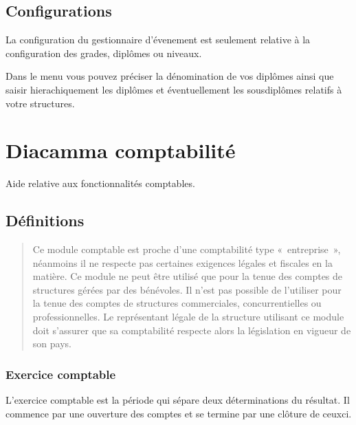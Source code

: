 \documentclass[a4paper,10pt,oneside,french]{sphinxmanual}
\begin{document}
\section{Configurations}
\label{\detokenize{event/config:configurations}}\label{\detokenize{event/config::doc}}
\sphinxAtStartPar
La configuration du gestionnaire d’évenement est seulement relative à la configuration des grades, diplômes ou niveaux.

\sphinxAtStartPar
Dans le menu  vous pouvez préciser la dénomination de vos diplômes
ainsi que saisir hierachiquement les diplômes et éventuellement les sous\sphinxhyphen{}diplômes relatifs à votre structures.


\chapter{Diacamma comptabilité}
\label{\detokenize{accounting/index:diacamma-comptabilite}}\label{\detokenize{accounting/index::doc}}
\sphinxAtStartPar
Aide relative aux fonctionnalités comptables.


\section{Définitions}
\label{\detokenize{accounting/definition:definitions}}\label{\detokenize{accounting/definition::doc}}\begin{quote}

\sphinxAtStartPar
{} Ce module comptable est proche d’une comptabilité type « entreprise », néanmoins il ne respecte pas certaines exigences légales et fiscales en la matière.
Ce module ne peut être utilisé que pour la tenue des comptes de structures gérées par des bénévoles. Il n’est pas possible de l’utiliser pour la tenue des comptes de structures commerciales, concurrentielles ou professionnelles.
Le représentant légale de la structure utilisant ce module doit s’assurer que sa comptabilité respecte alors la législation en vigueur de son pays.
\end{quote}


\subsection{Exercice comptable}
\label{\detokenize{accounting/definition:exercice-comptable}}
\sphinxAtStartPar
L’exercice comptable est la période qui sépare deux déterminations du résultat. Il commence par une ouverture des comptes et se termine par une clôture de ceux\sphinxhyphen{}ci.
\end{document}
